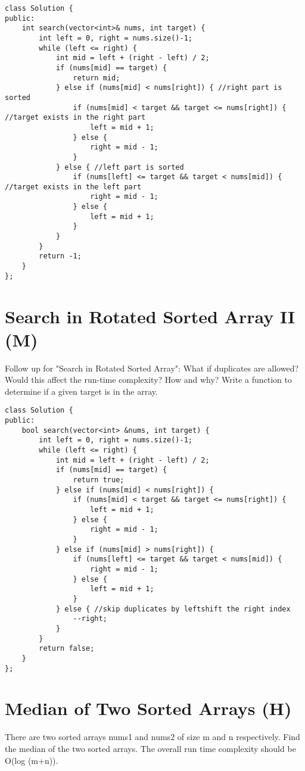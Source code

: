 \begin{lstlisting}
class Solution {
public:
    int search(vector<int>& nums, int target) {
        int left = 0, right = nums.size()-1;
        while (left <= right) {
            int mid = left + (right - left) / 2;
            if (nums[mid] == target) {
                return mid;
            } else if (nums[mid] < nums[right]) { //right part is sorted
                if (nums[mid] < target && target <= nums[right]) { //target exists in the right part
                    left = mid + 1;
                } else {
                    right = mid - 1;
                }            
            } else { //left part is sorted
                if (nums[left] <= target && target < nums[mid]) { //target exists in the left part
                    right = mid - 1;
                } else {
                    left = mid + 1;
                }
            }
        }
        return -1;
    }
};
\end{lstlisting}


\section{Search in Rotated Sorted Array II (M)}
Follow up for "Search in Rotated Sorted Array":
What if duplicates are allowed?
Would this affect the run-time complexity? How and why?
Write a function to determine if a given target is in the array.\\

\begin{lstlisting}
class Solution {
public:
    bool search(vector<int> &nums, int target) {
        int left = 0, right = nums.size()-1;
        while (left <= right) {
            int mid = left + (right - left) / 2;
            if (nums[mid] == target) {
                return true;
            } else if (nums[mid] < nums[right]) {
                if (nums[mid] < target && target <= nums[right]) {
                    left = mid + 1;
                } else {
                    right = mid - 1;
                }
            } else if (nums[mid] > nums[right]) {
                if (nums[left] <= target && target < nums[mid]) {
                    right = mid - 1;
                } else {
                    left = mid + 1;
                }
            } else { //skip duplicates by leftshift the right index
                --right;
            }
        }
        return false;
    }
};
\end{lstlisting}


\section{Median of Two Sorted Arrays (H)}
There are two sorted arrays nums1 and nums2 of size m and n respectively. Find the median of the two sorted arrays. The overall run time complexity should be O(log (m+n)).\\

